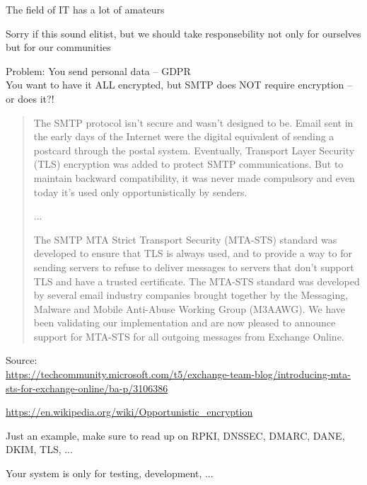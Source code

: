 \documentclass[Screen16to9,17pt]{foils}
\begin{document}
\begin{list2}
\item The field of IT has a lot of amateurs
\item Sorry if this sound elitist, but we should take responsebility not only for ourselves but for our communities
\end{list2}


Problem: You send personal data -- GDPR\\
You want to have it ALL encrypted, but SMTP does NOT require encryption -- or does it?!

\vskip 1cm

\begin{quote}\footnotesize
The SMTP protocol isn’t secure and wasn’t designed to be. Email sent in the early days of the Internet were the digital equivalent of sending a postcard through the postal system. Eventually, Transport Layer Security (TLS) encryption was added to protect SMTP communications. But to maintain backward compatibility, it was never made compulsory and even today it’s used only opportunistically by senders.

...

The SMTP MTA Strict Transport Security (MTA-STS) standard was developed to ensure that TLS is always used, and to provide a way to for sending servers to refuse to deliver messages to servers that don’t support TLS and have a trusted certificate. The MTA-STS standard was developed by several email industry companies brought together by the Messaging, Malware and Mobile Anti-Abuse Working Group (M3AAWG). We have been validating our implementation and are now pleased to announce support for MTA-STS for all outgoing messages from Exchange Online.
\end{quote}
Source:\\
 {\scriptsize\url{https://techcommunity.microsoft.com/t5/exchange-team-blog/introducing-mta-sts-for-exchange-online/ba-p/3106386}}

\begin{list2}
\item \url{https://en.wikipedia.org/wiki/Opportunistic_encryption}
\item Just an example, make sure to read up on RPKI, DNSSEC, DMARC, DANE, DKIM, TLS, ...
\end{list2}



Your system is only for testing, development, ...
\end{document}
